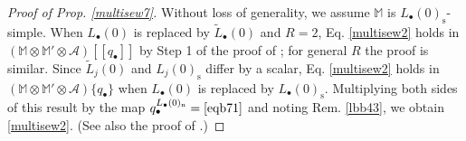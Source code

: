 \documentclass[11pt,b5paper,notitlepage]{article}
\theoremstyle{definition}
\theoremstyle{plain}
\newcommand{\wtd}{\widetilde}
\newcommand{\End}{\mathrm{End}} %
\newcommand{\scr}{\mathscr}
\newcommand{\blt}{\bullet}
\newcommand{\Mbb}{\mathbb M}
\newcommand{\btl}{\blacktriangleleft}
\newcommand{\btr}{\blacktriangleright}
\newcommand{\Ljss}{{L_j(0)_\mathrm{s}}}
\newcommand{\Ljni}{{L_j(0)_\mathrm{n}}}
\newcommand{\<}{\left\langle}
\renewcommand{\>}{\right\rangle}
\newcommand{\MU}{\mathcal{U}}
\newcommand{\Lbni}{{L_\bullet(0)_\mathrm{n}}}
\newcommand{\Lbss}{{L_\bullet(0)_\mathrm{s}}}
\numberwithin{equation}{section}
\begin{document}
\begin{proof}[Proof of Prop. \ref{multisew7}]
Without loss of generality, we assume $\Mbb$ is $\Lbss$-simple. When $L_\blt(0)$ is replaced by $\wtd L_\blt(0)$ and $R=2$, Eq. \eqref{multisew2} holds in $(\Mbb\otimes \Mbb'\otimes \scr A)[[q_\blt]]$ by Step 1 of the proof of \cite[Prop. 2.32]{GZ1}; for general $R$ the proof is similar. Since $\wtd L_j(0)$ and $\Ljss$ differ by a scalar, Eq. \eqref{multisew2} holds in $(\Mbb\otimes \Mbb'\otimes \scr A)\{q_\blt\}$ when $L_\blt(0)$ is replaced by $\Lbss$. Multiplying both sides of this result by the map $q_\blt^{\Lbni}=\eqref{eqb71} $ and noting Rem. \ref{lbb43}, we obtain \eqref{multisew2}. (See also the proof of \cite[Lem. 10.2]{Gui-sewingconvergence}.)
\end{proof}

\begin{comment}
\begin{proof}
    Without loss of generality, we may assume $\Mbb$ is $\Ljss$-simple for each $1\leq j\leq R$. Then we have $L_j(0)=\Ljss+\Ljni=\wtd L_j(0)+\lambda_j+\Ljni$. Note that $L_j(0)$ and $L_k(0)_{\mathrm{n}}$ commute with $Y_{\Mbb,k}$ for $j\ne k$. We obtain
    \begin{align*}
    \big(Y_{\Mbb,k}(\xi_k^{L(0)}u,\xi_k)q_\blt^{\wtd L_\blt(0)}\big)^t=Y_{\Mbb',k}\big((q_k/\xi_k)^{L(0)}\MU(\upgamma_1)u,q_k/\xi_k\big)q_\blt^{\wtd L_\blt (0)}
    \end{align*}
    in $\End(\Mbb')[[\xi_k^{\pm 1},q_k^{\pm 1},q_{\blt \backslash k}]]$. This implies that 
    \begin{align*}
        Y_{\Mbb,k}(\xi_k^{L(0)}u,\xi_k)q_\blt^{\wtd L_\blt(0)}\btr\otimes \btl
        =q_\blt^{\wtd L_\blt(0)}\btr\otimes Y_{\Mbb',k}\big((q_k/\xi_k)^{L(0)}\MU(\upgamma_1)u,q_k/\xi_k\big)\btl
    \end{align*}
    in $(\Mbb\otimes \Mbb')[[\xi_k^{\pm 1},q_k^{\pm 1},q_{\blt \backslash k}]]$.


\end{comment}
\end{document}
